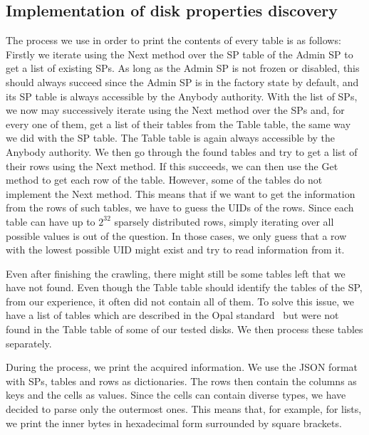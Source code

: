 \subsection{Implementation of disk properties discovery}

The process we use in order to print the contents of every table is as follows:
Firstly we iterate using the Next method over the SP table of the Admin SP to get a list of existing SPs. As long as the Admin SP is not frozen or disabled, this should always succeed since the Admin SP is in the factory state by default, and its SP table is always accessible by the Anybody authority. 
With the list of SPs, we now may successively iterate using the Next method over the SPs and, for every one of them, get a list of their tables from the Table table, the same way we did with the SP table. The Table table is again always accessible by the Anybody authority.
We then go through the found tables and try to get a list of their rows using the Next method. If this succeeds, we can then use the Get method to get each row of the table. However, some of the tables do not implement the Next method. This means that if we want to get the information from the rows of such tables, we have to guess the UIDs of the rows. Since each table can have up to $2^{32}$ sparsely distributed rows, simply iterating over all possible values is out of the question. In those cases, we only guess that a row with the lowest possible UID might exist and try to read information from it.

Even after finishing the crawling, there might still be some tables left that we have not found. Even though the Table table should identify the tables of the SP, from our experience, it often did not contain all of them. To solve this issue, we have a list of tables which are described in the Opal standard~\cite{tcg-opal2} but were not found in the Table table of some of our tested disks. We then process these tables separately.

During the process, we print the acquired information. We use the JSON format with SPs, tables and rows as dictionaries. The rows then contain the columns as keys and the cells as values. Since the cells can contain diverse types, we have decided to 
parse only the outermost ones. This means that, for example, for lists, we print the inner bytes in hexadecimal form surrounded by square brackets.





